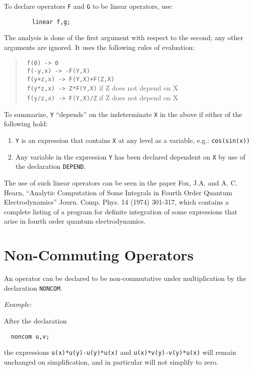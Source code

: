 To declare operators \texttt{F} and \texttt{G} to be linear operators,
use:
\begin{verbatim}
        linear f,g;
\end{verbatim}
The analysis is done of the first argument with respect to the second; any
other arguments are ignored. It uses the following rules of evaluation:
\begin{quote}
\begin{tabbing}
\texttt{   f(0)      ->   0} \\
\texttt{   f(-y,x)   ->  -F(Y,X)} \\
\texttt{   f(y+z,x)  ->   F(Y,X)+F(Z,X)} \\
\texttt{   f(y*z,x)  ->   Z*F(Y,X)} \hspace{0.5in}\= if Z does not depend on X \\
\texttt{   f(y/z,x)  ->   F(Y,X)/Z} \> if Z does not depend on X
\end{tabbing}
\end{quote}
To summarize, \texttt{Y} ``depends'' on the indeterminate \texttt{X} in the above
if either of the following hold:
\begin{enumerate}
\item \texttt{Y} is an expression that contains \texttt{X} at any level as a
      variable, e.g.: \texttt{cos(sin(x))}

\item Any variable in the expression \texttt{Y} has been declared dependent on
      \texttt{X} by use of the declaration \texttt{DEPEND}.
\end{enumerate}
The use of such linear operators can be seen in the
paper Fox, J.A. and A. C. Hearn, ``Analytic Computation of Some Integrals
in Fourth Order Quantum Electrodynamics'' Journ. Comp. Phys. 14 (1974)
301-317, which contains a complete listing of a program for definite
integration of some expressions that arise in fourth
order quantum electrodynamics.

\section{Non-Commuting Operators}
\hypertarget{command:NONCOM}{}
An operator can be declared to be non-commutative under multiplication by
the declaration \texttt{NONCOM}.

\textit{Example:}

After the declaration
\begin{verbatim}
  noncom u,v;
\end{verbatim}
the expressions \texttt{u(x)*u(y)-u(y)*u(x)} and \texttt{u(x)*v(y)-v(y)*u(x)} 
will remain unchanged
on simplification, and in particular will not simplify to zero.

